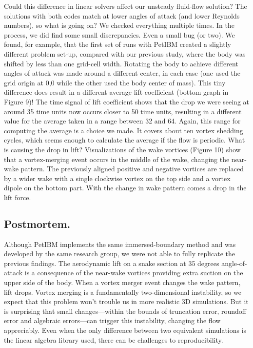 \documentclass[9pt,twocolumn,twoside]{article}
\newlength{\up}
\begin{document}
Could this difference in linear solvers affect our unsteady fluid-flow solution? 
The solutions with both codes match at lower angles of attack (and lower Reynolds numbers), so what is going on? 
We checked everything multiple times. 
In the process, we did find some small discrepancies. 
Even a small bug (or two).
We found, for example, that the first set of runs with PetIBM created a slightly different problem set-up, compared with our previous study, where the body was shifted by less than one grid-cell width. 
Rotating the body to achieve different angles of attack was made around a different center, in each case (one used the grid origin at 0,0 while the other used the body center of mass). 
This tiny difference does result in a different average lift coefficient (bottom graph in Figure 9)! 
The time signal of lift coefficient shows that the drop we were seeing at around 35 time units now occurs closer to 50 time units, resulting in a different value for the average taken in a range between 32 and 64. 
Again, this range for computing the average is a choice we made. 
It covers about ten vortex shedding cycles, which seems enough to calculate the average if the flow is periodic.
What is causing the drop in lift? 
Visualizations of the wake vortices (Figure 10) show that a vortex-merging event occurs in the middle of the wake, changing the near-wake pattern. 
The previously aligned positive and negative vortices are replaced by a wider wake with a single clockwise vortex on the top side and a vortex dipole on the bottom part. 
With the change in wake pattern comes a drop in the lift force. 

\subsection*{Postmortem.} 
Although PetIBM implements the same immersed-boundary method and was developed by the same research group, we were not able to fully replicate the previous findings. 
The aerodynamic lift on a snake section at 35 degrees angle-of-attack is a consequence of the near-wake vortices providing extra suction on the upper side of the body. 
When a vortex merger event changes the wake pattern, lift drops. 
Vortex merging is a fundamentally two-dimensional instability, so we expect that this problem won't trouble us in more realistic 3D simulations. 
But it is surprising that small changes---within the bounds of truncation error, roundoff error and algebraic errors---can trigger this instability, changing the flow appreciably. 
Even when the only difference between two equivalent simulations is the linear algebra library used, there can be challenges to reproducibility.
\end{document}
